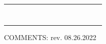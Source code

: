 \documentclass{sop_class}[overrideChapters] %
\begin{document}
{\begin{landscape}
\begin{table}[!htbp]
\begin{threeparttable}
\begin{tabular}{|c|c|c|c|c|c|c|c|c|c|c|c|c|c|}
            \hline
            {} & {} & {} & {} & {} & {} & {} & {} & {} & {} & {} & {} & {} & {}\\
            \hline
            {} & {} & {} & {} & {} & {} & {} & {} & {} & {} & {} & {} & {} & {}\\
            \hline
            {} & {} & {} & {} & {} & {} & {} & {} & {} & {} & {} & {} & {} & {}\\
            \hline
            {} & {} & {} & {} & {} & {} & {} & {} & {} & {} & {} & {} & {} & {}\\
            \hline
            {} & {} & {} & {} & {} & {} & {} & {} & {} & {} & {} & {} & {} & {}\\
            \hline
            {} & {} & {} & {} & {} & {} & {} & {} & {} & {} & {} & {} & {} & {}\\
            \hline
            {} & {} & {} & {} & {} & {} & {} & {} & {} & {} & {} & {} & {} & {}\\
            \hline
            {} & {} & {} & {} & {} & {} & {} & {} & {} & {} & {} & {} & {} & {}\\
            \hline
            {} & {} & {} & {} & {} & {} & {} & {} & {} & {} & {} & {} & {} & {}\\
            \hline
            \bottomrule
            \end{tabular}
        \begin{tablenotes}
            \small
            \item COMMENTS: \hfill{} rev. 08.26.2022 \\\
            \\
            \\
            \
        \end{tablenotes}
    \end{threeparttable}
\end{table}
 \end{landscape}
\clearpage
\newpage
\begin{landscape} %

\end{landscape}}
\end{document}
